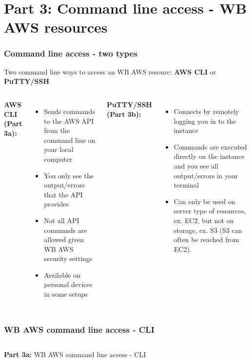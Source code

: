 \documentclass[aspectratio=169]{beamer} %
\begin{document}
\section{Part 3: Command line access - WB AWS resources}

\begin{frame}
	\frametitle{Command line access - two types}

	Two command line ways to access an WB AWS resourc:
	 \textbf{AWS CLI} or \textbf{PuTTY/SSH}

	\vspace{.5cm}

	\begin{columns}[t]
		
		\textbf{AWS CLI (Part 3a):}
		\begin{itemize}
			\item Sends commands to the AWS API from 
			the command line on your local computer
			\item You only see the output/errors 
			that the API provides
			\item Not all API commands are allowed given
			WB AWS security settings
			\item Available on personal devices in some setups
		\end{itemize}
	
		\textbf{PuTTY/SSH (Part 3b):}
		\begin{itemize}
			\item Connects by remotely logging you in to the instance
			\item Commands are executed directly on the instance
			 and you see all output/errors in your terminal
			\item Can only be used on server type of resources,
			ex. EC2, but not on storage, ex. S3
			(S3 can often be reached from EC2).
		\end{itemize}
		
	\end{columns}
\end{frame}

\begin{frame}
	\frametitle{WB AWS command line access - CLI}
	\begin{columns}[c]
		
		
		\textbf{Part 3a:} WB AWS command line access - CLI
		
	\end{columns}
\end{frame}
\end{document}

